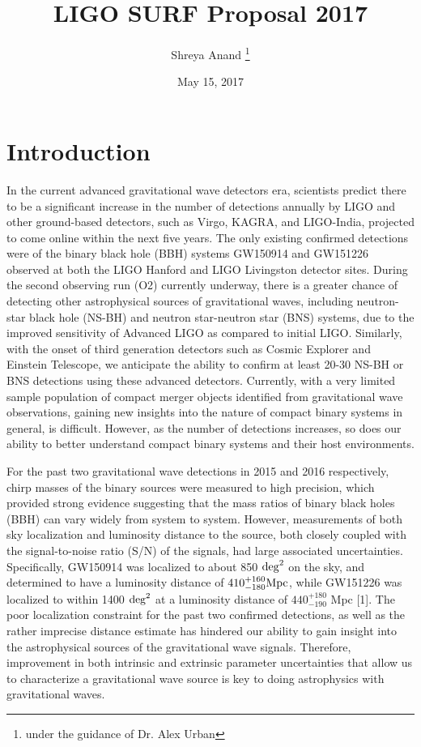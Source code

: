 \documentclass{article}
\title{LIGO SURF Proposal 2017}
\author{Shreya Anand \thanks{under the guidance of Dr. Alex Urban}}
\date{May 15, 2017}
\begin{document}
\begin{titlepage}
\maketitle
\thispagestyle{empty}
\end{titlepage}

\section{Introduction}

In the current advanced gravitational wave detectors era, scientists predict there to be a significant increase in the number of detections annually by LIGO and other ground-based detectors, such as Virgo, KAGRA, and LIGO-India, projected to come online within the next five years.  The only existing confirmed detections were of the binary black hole (BBH) systems GW150914 and GW151226 observed at both the LIGO Hanford and LIGO Livingston detector sites.  During the second observing run (O2) currently underway, there is a greater chance of detecting other astrophysical sources of gravitational waves, including neutron-star black hole (NS-BH) and neutron star-neutron star (BNS) systems, due to the improved sensitivity of Advanced LIGO as compared to initial LIGO.  Similarly, with the onset of third generation detectors such as Cosmic Explorer and Einstein Telescope, we anticipate the ability to confirm at least 20-30 NS-BH or BNS detections using these advanced detectors.  Currently, with a very limited sample population of compact merger objects identified from gravitational wave observations, gaining new insights into the nature of compact binary systems in general,  is difficult.  However, as the number of detections increases, so does our ability to better understand compact binary systems and their host environments.

For the past two gravitational wave detections in 2015 and 2016 respectively, chirp masses of the binary sources were measured to high precision, which provided strong evidence suggesting that the mass ratios of binary black holes (BBH) can vary widely from system to system.  However, measurements of both sky localization and luminosity distance to the source, both closely coupled with the signal-to-noise ratio (S/N) of the signals, had large associated uncertainties.  Specifically, GW150914 was localized to about 850 ${\rm deg}^{2}$ on the sky, and determined to have a luminosity distance of $410^{+160}_{-180} {\rm Mpc}$, while GW151226 was localized to within 1400 ${\rm deg}^{2}$ at a luminosity distance of $440^{+180}_{-190}$ Mpc [1].  The poor localization constraint for the past two confirmed detections, as well as the rather imprecise distance estimate has hindered our ability to gain insight into the astrophysical sources of the gravitational wave signals.  Therefore, improvement in both intrinsic and extrinsic parameter uncertainties that allow us to characterize a gravitational wave source is key to doing astrophysics with gravitational waves.      
 
\end{document}
